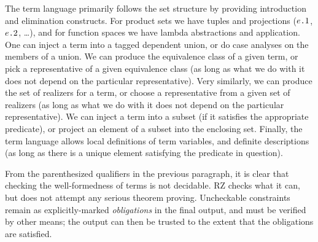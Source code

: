 The term language primarily follows the set structure by providing
introduction and elimination constructs. For product sets we have tuples and
projections ($e\texttt{.}1$, $e\texttt{.}2$, \ldots), and for function spaces we have lambda abstractions and
application. One can inject a term into a tagged dependent union, or do case analyses
on the members of a union. We can produce the equivalence class of a given
term, or pick a representative of a given equivalence class (as long as what we
do with it does not depend on the particular representative). Very similarly,
we can produce the set of realizers for a term, or choose a representative from
a given set of realizers (as long as what we do with it does not depend on the
particular representative). We can inject a term into a subset (if it satisfies
the appropriate predicate), or project an element of a subset into the
enclosing set. Finally, the term language allows local definitions of term
variables, and definite descriptions (as long as there is a unique element
satisfying the predicate in question).

From the parenthesized qualifiers in the previous paragraph, it is clear that checking the
well-formedness of terms is not decidable. RZ checks what it can, but does not
attempt any serious theorem proving.  Uncheckable constraints remain as
explicitly-marked \emph{obligations} in the final output, and must be verified
by other means; the output can then be trusted to the extent that the obligations are satisfied.






